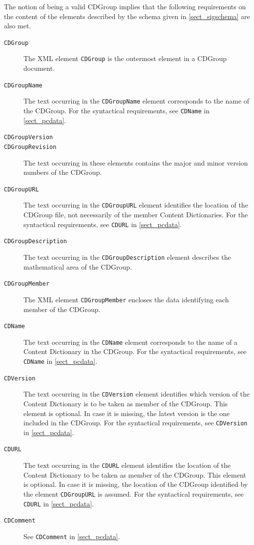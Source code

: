 \documentclass{report}
\def\XML{XML\xspace}
\begin{document}
The notion of being a valid CDGroup implies that the following requirements on the content
of the elements described by the schema given in \ref{sect_sigschema} are also met.

\begin{description}
\item[\lstinline|CDGroup|] The \XML element \lstinline|CDGroup| is the outermost element
  in a CDGroup document.
\item[\lstinline|CDGroupName|] The text occurring in the \lstinline|CDGroupName| element
  corresponds to the name of the CDGroup. For the syntactical requirements, see
  \lstinline|CDName| in \ref{sect_pcdata}.
\item[\lstinline|CDGroupVersion|]
\item[\lstinline|CDGroupRevision|] The text occurring in these elements contains the
  major and minor version numbers of the CDGroup.
\item[\lstinline|CDGroupURL|] The text occurring in the \lstinline|CDGroupURL| element
  identifies the location of the CDGroup file, not necessarily of the member Content
  Dictionaries. For the syntactical requirements, see \lstinline|CDURL| in
  \ref{sect_pcdata}.
\item[\lstinline|CDGroupDescription|] The text occurring in the
  \lstinline|CDGroupDescription| element describes the mathematical area of the CDGroup.
\item[\lstinline|CDGroupMember|] The \XML element \lstinline|CDGroupMember| encloses the
  data identifying each member of the CDGroup.
\item[\lstinline|CDName|] The text occurring in the \lstinline|CDName| element
  corresponds to the name of a Content Dictionary in the CDGroup. For the syntactical
  requirements, see \lstinline|CDName| in \ref{sect_pcdata}.
\item[\lstinline|CDVersion|] The text occurring in the \lstinline|CDVersion| element
  identifies which version of the Content Dictionary is to be taken as member of the
  CDGroup. This element is optional. In case it is missing, the latest version is the one
  included in the CDGroup.  For the syntactical requirements, see \lstinline|CDVersion|
  in \ref{sect_pcdata}.
\item[\lstinline|CDURL|] The text occurring in the \lstinline|CDURL| element identifies
  the location of the Content Dictionary to be taken as member of the CDGroup. This
  element is optional. In case it is missing, the location of the CDGroup identified by
  the element \lstinline|CDGroupURL| is assumed.  For the syntactical requirements, see
  \lstinline|CDURL| in \ref{sect_pcdata}.
\item[\lstinline|CDComment|] See \lstinline|CDComment| in \ref{sect_pcdata}.
\end{description}
\end{document}
